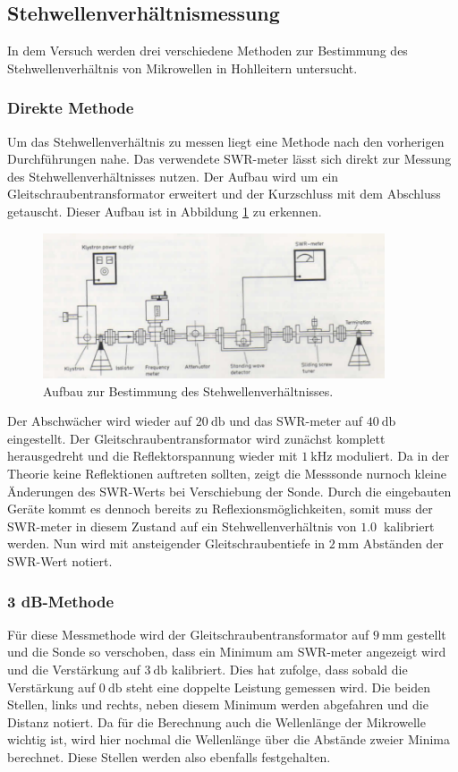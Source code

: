 \subsection{Stehwellenverhältnismessung}
In dem Versuch werden drei verschiedene Methoden zur Bestimmung des Stehwellenverhältnis von Mikrowellen in Hohlleitern untersucht.

\subsubsection{Direkte Methode}
Um das Stehwellenverhältnis zu messen liegt eine Methode nach den vorherigen Durchführungen nahe. Das verwendete SWR-meter lässt sich direkt zur Messung des Stehwellenverhältnisses nutzen. Der Aufbau wird um ein Gleitschraubentransformator erweitert
und der Kurzschluss mit dem Abschluss getauscht. Dieser Aufbau ist in Abbildung \ref{fig:3} zu erkennen. 

\begin{figure}
    \centering
    \includegraphics[width=0.9\textwidth]{Bilder/aufbau3.png}
    \caption{Aufbau zur Bestimmung des Stehwellenverhältnisses. \cite{skript}} 
    \label{fig:3}
\end{figure}
Der Abschwächer wird wieder auf $\SI{20}{\decibel}$ und das SWR-meter auf $\SI{40}{\decibel}$ eingestellt. Der Gleitschraubentransformator wird zunächst komplett herausgedreht und die Reflektorspannung wieder mit $\SI{1}{\kilo\hertz}$ moduliert.
Da in der Theorie keine Reflektionen auftreten sollten, zeigt die Messsonde nurnoch kleine Änderungen des SWR-Werts bei Verschiebung der Sonde. Durch die eingebauten Geräte kommt es dennoch bereits zu Reflexionsmöglichkeiten, somit muss 
der SWR-meter in diesem Zustand auf ein Stehwellenverhältnis von $\SI{1.0}{}$ kalibriert werden. Nun wird mit ansteigender Gleitschraubentiefe in $\SI{2}{\milli\meter}$ Abständen der SWR-Wert notiert.

\subsubsection{3 dB-Methode}
Für diese Messmethode wird der Gleitschraubentransformator auf $\SI{9}{\milli\meter}$ gestellt und die Sonde so verschoben, dass ein Minimum am SWR-meter angezeigt wird und die Verstärkung auf $\SI{3}{\decibel}$ kalibriert.  Dies hat zufolge, dass 
sobald die Verstärkung auf $\SI{0}{\decibel}$ steht eine doppelte Leistung gemessen wird. Die beiden Stellen, links und rechts, neben diesem Minimum werden abgefahren und die Distanz notiert. Da für die Berechnung auch die
Wellenlänge der Mikrowelle wichtig ist, wird hier nochmal die Wellenlänge über die Abstände zweier Minima berechnet. Diese Stellen werden also ebenfalls festgehalten.

